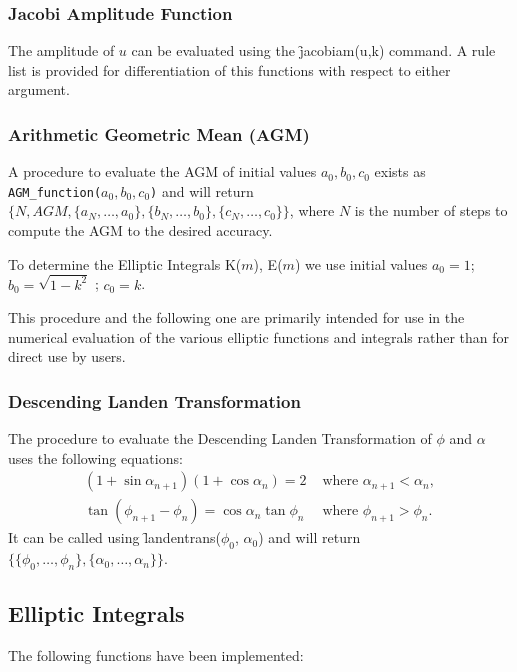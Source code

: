 \subsubsection{Jacobi Amplitude Function}
\hypertarget{operator:JACOBIAM}{}
The amplitude of $u$ can be evaluated using the \f{jacobiam(u,k)}
command.  A rule list is provided for differentiation of this
functions with respect to either argument.

\subsubsection{Arithmetic Geometric Mean (AGM)}
\hypertarget{operator:AGM_FUNCTION}{}
A procedure to evaluate the AGM of initial values \(a_0,b_0,c_0\)
exists as \\
\texttt{AGM\_function(\(a_0,b_0,c_0\))} and will return \\
$\{ N, AGM, \{ a_N, \ldots ,a_0\}, \{ b_N, \ldots ,b_0\},
\{c_N, \ldots ,c_0\}\}$,
where $N$ is the number of steps to compute the AGM to the
desired accuracy.

To determine the Elliptic Integrals K($m$), E($m$) we use initial values
\(a_0 = 1\); \(b_0 = \sqrt{1-k^2}\) ; \(c_0 = k\).

This procedure and the following one are primarily intended for use in the
numerical evaluation of the various elliptic functions and integrals rather
than for direct use by users.

\subsubsection{Descending Landen Transformation}
The procedure to evaluate the Descending Landen Transformation of
$\phi$ and $\alpha$ uses the following equations:
\begin{align*}
 (1+\sin \alpha_{n+1})(1+\cos \alpha_n)=2 &\text{ where } \alpha_{n+1}<\alpha_n, \\
  \tan(\phi_{n+1}-\phi_n)=\cos \alpha_n \tan \phi_n & \text{ where } \phi_{n+1}>\phi_n.
\end{align*}
It can be called using \f{landentrans}($\phi_0$, $\alpha_0$)
and will return \\
$\{\{\phi_0, \ldots ,\phi_n\},\{\alpha_0, \ldots ,\alpha_n\}\}$.

\subsection{Elliptic Integrals}
\hypertarget{ELLIPI}{}
The following functions have been implemented:

